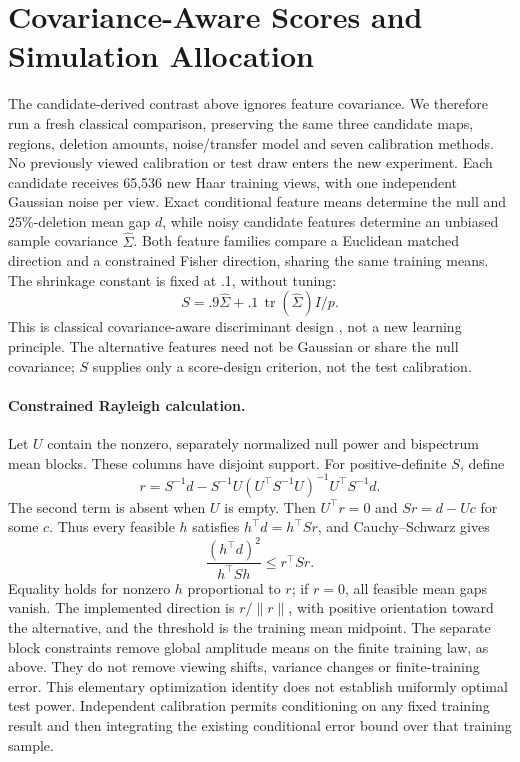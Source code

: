 \section{Covariance-Aware Scores and Simulation Allocation}
\label{app:fisherscore}
The candidate-derived contrast above ignores feature covariance. We therefore
run a fresh classical comparison, preserving the same three candidate maps,
regions, deletion amounts, noise/transfer model and seven calibration methods.
No previously viewed calibration or test draw enters the new experiment.
Each candidate receives 65,536 new Haar training views, with one independent
Gaussian noise per view. Exact conditional feature means determine the null
and 25\%-deletion mean gap $d$, while noisy candidate features determine an
unbiased sample covariance $\widehat\Sigma$. Both feature families compare
a Euclidean matched direction and a constrained Fisher direction, sharing
the same training means. The shrinkage constant is fixed at .1, without tuning:
\[
 S=.9\widehat\Sigma+.1\,\operatorname{tr}(\widehat\Sigma)I/p.
\]
This is classical covariance-aware discriminant design
\citep{friedman1989rda}, not a new learning principle. The alternative
features need not be Gaussian or share the null covariance; $S$ supplies
only a score-design criterion, not the test calibration.

\paragraph{Constrained Rayleigh calculation.}
Let $U$ contain the nonzero, separately normalized null power and bispectrum
mean blocks. These columns have disjoint support. For positive-definite $S$,
define
\[
 r=S^{-1}d-S^{-1}U(U^\top S^{-1}U)^{-1}U^\top S^{-1}d.
\]
The second term is absent when $U$ is empty. Then $U^\top r=0$ and
$Sr=d-Uc$ for some $c$. Thus every feasible $h$ satisfies
$h^\top d=h^\top Sr$, and Cauchy--Schwarz gives
\[
 \frac{(h^\top d)^2}{h^\top Sh}\le r^\top Sr.
\]
Equality holds for nonzero $h$ proportional to $r$; if $r=0$, all feasible
mean gaps vanish. The implemented direction is $r/\|r\|$, with positive
orientation toward the alternative, and the threshold is the training
mean midpoint. The separate block constraints remove global amplitude means
on the finite training law, as above. They do not remove viewing shifts,
variance changes or finite-training error. This elementary optimization
identity does not establish uniformly optimal test power. Independent
calibration permits conditioning on any fixed training result and then
integrating the existing conditional error bound over that training sample.

